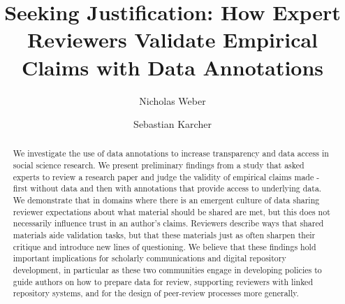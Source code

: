 \documentclass[sigchi]{acmart}
\begin{document}
\title{Seeking Justification: How Expert Reviewers Validate Empirical Claims with Data Annotations
}

\author{Nicholas Weber}

\author{Sebastian Karcher}



\renewcommand{\shortauthors}{Removed}

\begin{abstract}
We investigate the use of data annotations to increase transparency and data access in social science research. We present preliminary findings from a study that asked experts to review a research paper and judge the validity of empirical claims made - first without data and then with annotations that provide access to underlying data. We demonstrate that in domains where there is an emergent culture of data sharing reviewer expectations about what material should be shared are met, but this does not necessarily influence trust in an author's claims. Reviewers describe ways that shared materials aide validation tasks, but that these materials just as often sharpen their critique and introduce new lines of questioning. We believe that these findings hold important implications for scholarly communications and digital repository development, in particular as these two communities engage in developing policies to guide authors on how to prepare data for review, supporting reviewers with linked repository systems, and for the design of peer-review processes more generally. 
\end{abstract}
\end{document}
